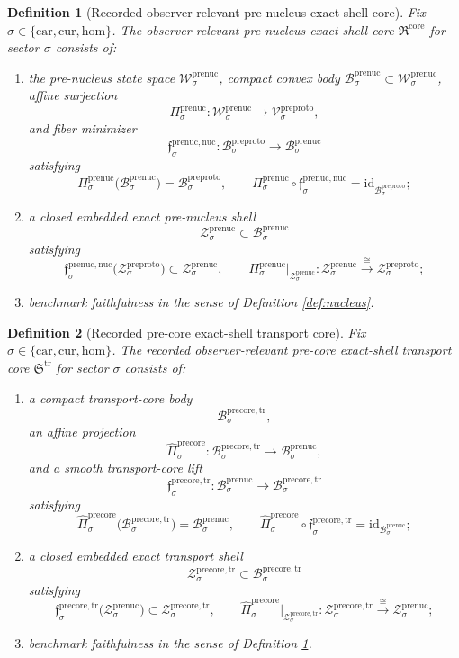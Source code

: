 \documentclass[11pt]{article}
\newcommand{\Car}{\mathrm{car}}
\newcommand{\Cur}{\mathrm{cur}}
\newcommand{\Hom}{\mathrm{hom}}
\newcommand{\PreProtoSpace}[1]{\mathcal V_{#1}^{\mathrm{preproto}}}
\newcommand{\PreProtoBody}[1]{\mathcal B_{#1}^{\mathrm{preproto}}}
\newcommand{\PreProtoShellSet}[1]{\mathcal Z_{#1}^{\mathrm{preproto}}}
\newcommand{\PreNucCore}{\mathfrak R^{\mathrm{core}}}
\newcommand{\PreNucSpace}[1]{\mathcal W_{#1}^{\mathrm{prenuc}}}
\newcommand{\PreNucBody}[1]{\mathcal B_{#1}^{\mathrm{prenuc}}}
\newcommand{\PreNucProj}[1]{\Pi_{#1}^{\mathrm{prenuc}}}
\newcommand{\PreNucNucleusMin}[1]{\mathfrak f_{#1}^{\mathrm{prenuc,nuc}}}
\newcommand{\PreNucShellSet}[1]{\mathcal Z_{#1}^{\mathrm{prenuc}}}
\newcommand{\PreCoreTransportCore}{\mathfrak S^{\mathrm{tr}}}
\newcommand{\PreCoreTrBody}[1]{\mathcal B_{#1}^{\mathrm{precore,tr}}}
\newcommand{\PreCoreTrProj}[1]{\widehat{\Pi}_{#1}^{\mathrm{precore}}}
\newcommand{\PreCoreTrLift}[1]{\mathfrak f_{#1}^{\mathrm{precore,tr}}}
\newcommand{\PreCoreTrShell}[1]{\mathcal Z_{#1}^{\mathrm{precore,tr}}}
\newtheorem{definition}{Definition}
\begin{document}
\begin{definition}[Recorded observer-relevant pre-nucleus exact-shell core]
\label{def:core}
Fix \(\sigma\in\{\Car,\Cur,\Hom\}\). The observer-relevant pre-nucleus exact-shell core \(\PreNucCore\) for sector \(\sigma\) consists of:
\begin{enumerate}
    \item the pre-nucleus state space \(\PreNucSpace{\sigma}\), compact convex body \(\PreNucBody{\sigma}\subset\PreNucSpace{\sigma}\), affine surjection
    \[
    \PreNucProj{\sigma}:\PreNucSpace{\sigma}\to\PreProtoSpace{\sigma},
    \]
    and fiber minimizer
    \[
    \PreNucNucleusMin{\sigma}:\PreProtoBody{\sigma}\to\PreNucBody{\sigma}
    \]
    satisfying
    \[
    \PreNucProj{\sigma}\bigl(\PreNucBody{\sigma}\bigr)=\PreProtoBody{\sigma},
    \qquad
    \PreNucProj{\sigma}\circ\PreNucNucleusMin{\sigma}
    =
    \mathrm{id}_{\PreProtoBody{\sigma}};
    \]
    \item a closed embedded exact pre-nucleus shell
    \[
    \PreNucShellSet{\sigma}\subset\PreNucBody{\sigma}
    \]
    satisfying
    \[
    \PreNucNucleusMin{\sigma}\bigl(\PreProtoShellSet{\sigma}\bigr)
    \subset
    \PreNucShellSet{\sigma},
    \qquad
    \PreNucProj{\sigma}\big|_{\PreNucShellSet{\sigma}}
    :
    \PreNucShellSet{\sigma}
    \xrightarrow{\cong}
    \PreProtoShellSet{\sigma};
    \]
    \item benchmark faithfulness in the sense of Definition \ref{def:nucleus}.
\end{enumerate}
\end{definition}

\begin{definition}[Recorded pre-core exact-shell transport core]
\label{def:transportcore}
Fix \(\sigma\in\{\Car,\Cur,\Hom\}\). The recorded observer-relevant pre-core exact-shell transport core \(\PreCoreTransportCore\) for sector \(\sigma\) consists of:
\begin{enumerate}
    \item a compact transport-core body
    \[
    \PreCoreTrBody{\sigma},
    \]
    an affine projection
    \[
    \PreCoreTrProj{\sigma}:\PreCoreTrBody{\sigma}\to\PreNucBody{\sigma},
    \]
    and a smooth transport-core lift
    \[
    \PreCoreTrLift{\sigma}:\PreNucBody{\sigma}\to\PreCoreTrBody{\sigma}
    \]
    satisfying
    \[
    \PreCoreTrProj{\sigma}\bigl(\PreCoreTrBody{\sigma}\bigr)=\PreNucBody{\sigma},
    \qquad
    \PreCoreTrProj{\sigma}\circ\PreCoreTrLift{\sigma}
    =
    \mathrm{id}_{\PreNucBody{\sigma}};
    \]
    \item a closed embedded exact transport shell
    \[
    \PreCoreTrShell{\sigma}\subset\PreCoreTrBody{\sigma}
    \]
    satisfying
    \[
    \PreCoreTrLift{\sigma}\bigl(\PreNucShellSet{\sigma}\bigr)
    \subset
    \PreCoreTrShell{\sigma},
    \qquad
    \PreCoreTrProj{\sigma}\big|_{\PreCoreTrShell{\sigma}}
    :
    \PreCoreTrShell{\sigma}
    \xrightarrow{\cong}
    \PreNucShellSet{\sigma};
    \]
    \item benchmark faithfulness in the sense of Definition \ref{def:core}.
\end{enumerate}
\end{definition}
\end{document}
